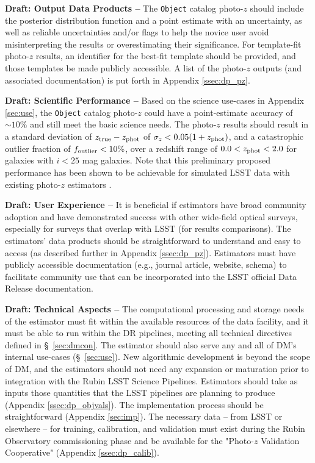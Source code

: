 \documentclass[DM,authoryear,toc]{lsstdoc}
\begin{document}
{\bf Draft: Output Data Products --} 
The {\tt Object} catalog photo-$z$ should include the posterior distribution function and a point estimate with an uncertainty, as well as reliable uncertainties and/or flags to help the novice user avoid misinterpreting the results or overestimating their significance.
For template-fit photo-$z$ results, an identifier for the best-fit template should be provided, and those templates be made publicly accessible.
A list of the photo-$z$ outputs (and associated documentation) is put forth in Appendix \ref{ssec:dp_pz}.

{\bf Draft: Scientific Performance --} 
Based on the science use-cases in Appendix \ref{sec:use}, the {\tt Object} catalog photo-$z$ could have a point-estimate accuracy of $\sim10\%$ and still meet the basic science needs.
The photo-$z$ results should result in a standard deviation of $z_{\rm true}-z_{\rm phot}$ of $\sigma_z < 0.05(1+z_{\rm phot})$, and a catastrophic outlier fraction of $f_{\rm outlier} < 10\%$, over a redshift range of $0.0 < z_{\rm phot} < 2.0$ for galaxies with $i<25$ mag galaxies.
Note that this preliminary proposed performance has been shown to be achievable for simulated LSST data with existing photo-$z$ estimators \citep[e.g.,][]{2018AJ....155....1G,2020MNRAS.499.1587S}.

{\bf Draft: User Experience --}
It is beneficial if estimators have broad community adoption and have demonstrated success with other wide-field optical surveys, especially for surveys that overlap with LSST (for results comparisons).
The estimators' data products should be straightforward to understand and easy to access (as described further in Appendix \ref{ssec:dp_pz}).
Estimators must have publicly accessible documentation (e.g., journal article, website, schema) to facilitate community use that can be incorporated into the LSST official Data Release documentation. 

{\bf Draft: Technical Aspects --}
The computational processing and storage needs of the estimator must fit within the available resources of the data facility, and it must be able to run within the DR pipelines, meeting all technical directives defined in \S~\ref{sec:dmcon}. 
The estimator should also serve any and all of DM's internal use-cases (\S~\ref{sec:use}).
New algorithmic development is beyond the scope of DM, and the estimators should not need any expansion or maturation prior to integration with the Rubin LSST Science Pipelines.
Estimators should take as inputs those quantities that the LSST pipelines are planning to produce (Appendix \ref{ssec:dp_objvals}).
The implementation process should be straightforward (Appendix \ref{sec:imp}).
The necessary data -- from LSST or elsewhere -- for training, calibration, and validation must exist during the Rubin Observatory commissioning phase and be available for the "Photo-$z$ Validation Cooperative" (Appendix \ref{ssec:dp_calib}).
\end{document}
